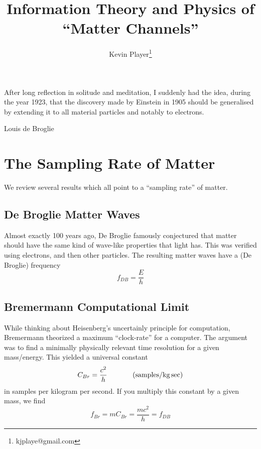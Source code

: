 \documentclass[12pt,a4paper]{article}
\begin{document}
\title{Information Theory and Physics of ``Matter Channels''}
\author[1]{Kevin Player\footnote{kjplaye@gmail.com}}

\maketitle

\epigraph{After long reflection in solitude and meditation, I suddenly had the idea, during the year 1923, that the discovery made by Einstein in 1905 should be generalised by extending it to all material particles and notably to electrons.}{Louis de Broglie}


\section{The Sampling Rate of Matter}
\label{rate}
We review several results which all point to a ``sampling rate'' of matter.
\subsection{De Broglie Matter Waves}
Almost exactly 100 years ago, De Broglie famously conjectured that matter should have the same kind of wave-like properties that light has.  This was verified using electrons, and then other particles.  The resulting matter waves have a (De Broglie) frequency
\[
  f_{DB} = \frac{E}{h}
\]

\subsection{Bremermann Computational Limit}
While thinking about Heisenberg's uncertainly principle for computation, Bremermann theorized a maximum ``clock-rate'' for a computer.  The argument was to find a minimally physically relevant time resolution for a given mass/energy.  This yielded a universal constant
\[
  C_{Br} = \frac{c^2}{h} \hspace{0.5 in} (\si[per-mode=symbol]{samples\per\kilogram.\sec})
\]
in samples per kilogram per second.  If you multiply this constant by a given mass, we find
\[
 f_{Br} = m C_{Br} = \frac{mc^2}{h} = f_{DB}
\]
\end{document}
